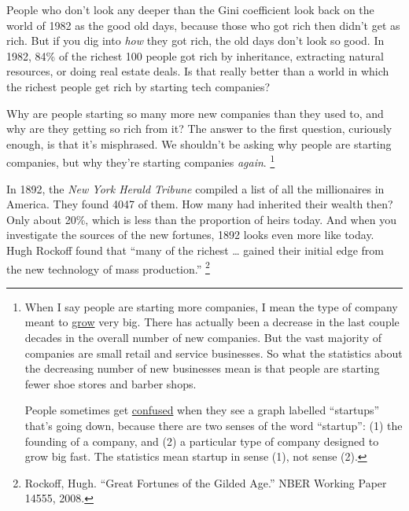 \documentclass[12pt]{book}
\begin{document}
People who don't look any deeper than the Gini coefficient look back on
the world of 1982 as the good old days, because those who got rich then
didn't get as rich. But if you dig into \emph{how} they got rich, the
old days don't look so good. In 1982, 84\% of the richest 100 people got
rich by inheritance, extracting natural resources, or doing real estate
deals. Is that really better than a world in which the richest people
get rich by starting tech companies?

Why are people starting so many more new companies than they used to,
and why are they getting so rich from it? The answer to the first
question, curiously enough, is that it's misphrased. We shouldn't be
asking why people are starting companies, but why they're starting
companies \emph{again}. \footnote{When I say people are starting more companies, I mean the type
of company meant to \href{growth.html}{grow} very big. There has
actually been a decrease in the last couple decades in the overall
number of new companies. But the vast majority of companies are small
retail and service businesses. So what the statistics about the
decreasing number of new businesses mean is that people are starting
fewer shoe stores and barber shops.

People sometimes get
\href{https://www.inc.com/magazine/201505/leigh-buchanan/the-vanishing-startups-in-decline.html}{confused}
when they see a graph labelled ``startups'' that's going down, because
there are two senses of the word ``startup'': (1) the founding of a
company, and (2) a particular type of company designed to grow big fast.
The statistics mean startup in sense (1), not sense (2).}

In 1892, the \emph{New York Herald Tribune} compiled a list of all the
millionaires in America. They found 4047 of them. How many had inherited
their wealth then? Only about 20\%, which is less than the proportion of
heirs today. And when you investigate the sources of the new fortunes,
1892 looks even more like today. Hugh Rockoff found that ``many of the
richest \ldots{} gained their initial edge from the new technology of
mass production.'' \footnote{Rockoff, Hugh. ``Great Fortunes of the Gilded Age.'' NBER
Working Paper 14555, 2008.}
\end{document}

